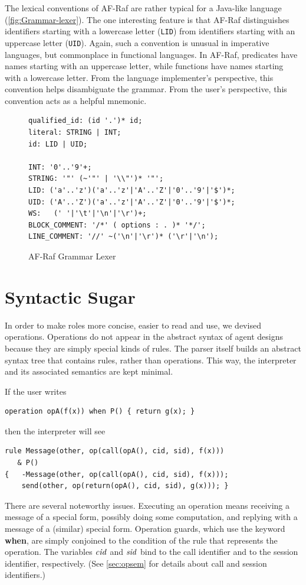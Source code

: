 \documentclass[a4paper,12pt,oneside,fleqn]{book} %
\begin{document}
{The lexical conventions of AF-Raf are rather typical for a Java-like
language (\autoref{fig:Grammar-lexer}). The one interesting feature is that
AF-Raf distinguishes identifiers starting with a lowercase letter
(\verb+LID+) from identifiers starting with an uppercase letter
(\verb+UID+). Again, such a convention is unusual in imperative languages,
but commonplace in functional languages. In AF-Raf, predicates have names
starting with an uppercase letter, while functions have names starting with
a lowercase letter. From the language implementer's perspective, this
convention helps disambiguate the grammar. From the user's perspective,
this convention acts as a helpful mnemonic.

\begin{figure}\footnotesize %
\begin{verbatim}
qualified_id: (id '.')* id;
literal: STRING | INT;
id: LID | UID;

INT: '0'..'9'+;
STRING: '"' (~'"' | '\\"')* '"';
LID: ('a'..'z')('a'..'z'|'A'..'Z'|'0'..'9'|'$')*;
UID: ('A'..'Z')('a'..'z'|'A'..'Z'|'0'..'9'|'$')*;
WS:   (' '|'\t'|'\n'|'\r')+;
BLOCK_COMMENT: '/*' ( options : . )* '*/';
LINE_COMMENT: '//' ~('\n'|'\r')* ('\r'|'\n');
\end{verbatim}
\caption{AF-Raf Grammar Lexer}
\label{fig:Grammar-lexer}
\end{figure} %
\section{Syntactic Sugar}\label{sec:sugar} %

In order to make roles more concise, easier to read and use, we devised
operations. Operations do not appear in the abstract syntax of agent
designs because they are simply special kinds of rules. The parser itself
builds an abstract syntax tree that contains rules, rather than operations.
This way, the interpreter and its associated semantics are kept minimal.

\begin{example}
If the user writes
\begin{verbatim}
operation opA(f(x)) when P() { return g(x); }
\end{verbatim}
then the interpreter will see
\begin{verbatim}
rule Message(other, op(call(opA(), cid, sid), f(x)))
   & P()
{   -Message(other, op(call(opA(), cid, sid), f(x)));
    send(other, op(return(opA(), cid, sid), g(x))); }
\end{verbatim}
There are several noteworthy issues. Executing an operation means receiving
a message of a special form, possibly doing some computation, and replying
with a message of a (similar) special form. Operation guards, which use the
keyword {\bf when}, are simply conjoined to the condition of the rule that
represents the operation. The variables ${\it cid}$ and ${\it sid}$ bind to
the call identifier and to the session identifier, respectively. (See
\autoref{sec:opsem} for details about call and session identifiers.)
\end{example}

}
\end{document}
